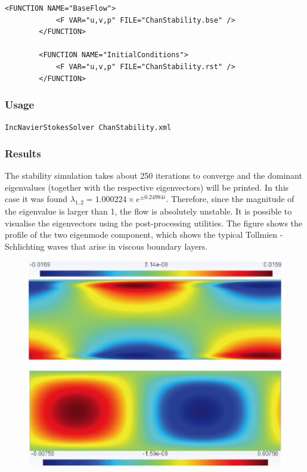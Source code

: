     \begin{lstlisting}[style=XMLStyle]
<FUNCTION NAME="BaseFlow">
            <F VAR="u,v,p" FILE="ChanStability.bse" />
        </FUNCTION>

        <FUNCTION NAME="InitialConditions">
            <F VAR="u,v,p" FILE="ChanStability.rst" />
        </FUNCTION>
                         \end{lstlisting}



\subsubsection{Usage}

\texttt{IncNavierStokesSolver ChanStability.xml}


\subsubsection{Results}

The stability simulation takes about 250 iterations to converge and the dominant eigenvalues (together with the respective eigenvectors) will be printed. In this case it was found $    \lambda_{1,2}=1.000224 \times e^{\pm 0.24984i}$. Therefore, since the magnitude of the eigenvalue is larger than 1, the flow is absolutely unstable. It is possible to visualise the eigenvectors using the post-processing utilities. The figure shows the profile of the two eigenmode component, which shows the typical Tollmien - Schlichting waves that arise in viscous boundary layers.

\begin{figure}[!htbp]
\centering
 {\includegraphics[width=1 \textwidth]{img/chan_u.png}}
   \caption {}
\end{figure}

\begin{figure}[!htbp]
\centering
 {\includegraphics[width=1 \textwidth]{img/chan_v}}
    \caption {}
\end{figure}

